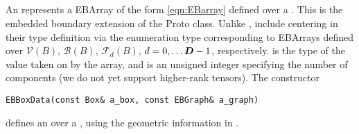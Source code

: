 \documentclass[12pt]{article}
\begin{document}
\subsection{}

An  represents a EBArray of the form \eqref{eqn:EBarray} defined over a .  This is the embedded boundary extension of the Proto  class. Unlike  ,  include centering in their type definition via the enumeration type  corresponding to EBArrays defined over $\mathcal{V}(B)$, $\mathcal{B}(B)$, $\mathcal{F}_d(B)$, $d = 0 , \dots  {\boldsymbol{D}}-1$, respectively.  is the type of the value taken on by the array, and  is an unsigned integer specifying the number of components (we do not yet support higher-rank tensors).
The constructor 
\begin{verbatim}
EBBoxData(const Box& a_box, const EBGraph& a_graph)
\end{verbatim} 
defines an  over a , using the geometric information in .
\end{document}
